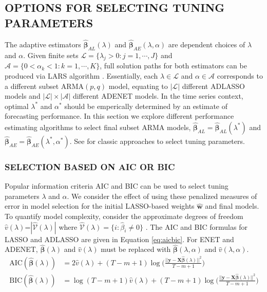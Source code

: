 \subsection{OPTIONS FOR SELECTING TUNING PARAMETERS}
The adaptive estimators $\hat{\bm{\beta}}_{AL} (\lambda)$ and $\hat{\bm{\beta}}_{AE} (\lambda,\alpha)$ are dependent choices of $\lambda$ and $\alpha$. Given finite sets $\mathcal{L}=\{\lambda_j>0: j=1,\cdots,J\}$ and $\mathcal{A}=\{0<\alpha_k<1: k=1,\cdots,K\}$, full solution paths for both estimators can be produced via LARS algorithm \citep{Efron2004}. Essentially, each $\lambda\in\mathcal{L}$ and $\alpha\in\mathcal{A}$ corresponds to a different subset ARMA$(p,q)$ model, equating to $|\mathcal{L}|$ different ADLASSO models and $|\mathcal{L}|\times|\mathcal{A}|$ different ADENET models. In the time series context, optimal $\lambda^*$ and $\alpha^*$ should be emperically determined by an estimate of forecasting performance. In this section we explore different performance estimating algorithms to select final subset ARMA models, $\hat{\bm{\beta}}_{AL}=\hat{\bm{\beta}}_{AL}(\lambda^*)$ and $\hat{\bm{\beta}}_{AE}=\hat{\bm{\beta}}_{AE}(\lambda^*,\alpha^*)$. See \cite[pg.241]{Hastie2009a} for classic approaches to select tuning parameters.

\subsubsection{SELECTION BASED ON AIC OR BIC}

Popular information criteria AIC and BIC can be used to select tuning parameters $\lambda$ and $\alpha$. We consider the effect of using these penalized measures of error in model selection for the initial LASSO-based weights $\hat{\bm{w}}$ and final models. To quantify model complexity, consider the approximate degrees of freedom $\hat{v}(\lambda)$=$|\widehat{\mathcal{V}}(\lambda)|$ where $\widehat{\mathcal{V}}(\lambda)=\{i:\hat{\beta}_i\neq 0\}$ \citep{Zou2007}. The AIC and BIC formulas for LASSO and ADLASSO are given in Equation \ref{eq:aicbic}. For ENET and ADENET, $\hat{\bm{\beta}}(\lambda)$ and $\hat{v}(\lambda)$ must be replaced with $\hat{\bm{\beta}}(\lambda,\alpha)$ and $\hat{v}(\lambda,\alpha)$.
\begin{equation}
\label{eq:aicbic}
\begin{split}
\textrm{AIC}(\hat{\bm{\beta}}(\lambda))&=2\hat{v}(\lambda)+(T-m+1)\log\bigg(\frac{||\bm{y}-\bm{X}\hat{\bm{\beta}}(\lambda)||^2}{T-m+1}\bigg)\\
\textrm{BIC}(\hat{\bm{\beta}}(\lambda))&=\log(T-m+1)\hat{v}(\lambda)+(T-m+1)\log\bigg(\frac{||\bm{y}-\bm{X}\hat{\bm{\beta}}(\lambda)||^2}{T-m+1}\bigg)\\
\end{split}
\end{equation}

